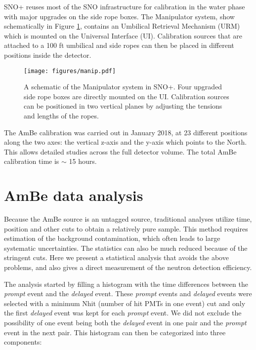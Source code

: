 \documentclass[a4paper]{jpconf}
\begin{document}
SNO+ reuses most of the SNO infrastructure for calibration\cite{Moffat:2005tq} in the water phase with major upgrades on the side rope boxes. The Manipulator system, show schematically in Figure \ref{fig:1}, contains an Umbilical Retrieval Mechanism (URM) which is mounted on the Universal Interface (UI). Calibration sources that are attached to a 100 ft umbilical and side ropes can then be placed in different positions inside the detector. 

\begin{figure}[h]
\texttt{[image: figures/manip.pdf]}\hspace{2pc}%
\begin{minipage}[b]{18pc}\caption{\label{fig:1}A schematic of the Manipulator system in SNO+. Four upgraded side rope boxes are directly mounted on the UI. Calibration sources can be positioned in two vertical planes by adjusting the tensions and lengths of the ropes.}
\end{minipage}
\end{figure}

The AmBe calibration was carried out in January 2018, at 23 different positions along the two axes: the vertical z-axis and the y-axis which points to the North. This allows detailed studies across the full detector volume. The total AmBe calibration time is $\sim$ 15 hours.

\section{AmBe data analysis}

Because the AmBe source is an untagged source, traditional analyses utilize time, position and other cuts to obtain a relatively pure sample. This method requires estimation of the background contamination, which often leads to large systematic uncertainties. The statistics can also be much reduced because of the stringent cuts. Here we present a statistical analysis that avoids the above problems, and also gives a direct measurement of the neutron detection efficiency.

The analysis started by filling a histogram with the time differences between the \textit{prompt} event and the \textit{delayed} event. These \textit{prompt} events and \textit{delayed} events were selected with a minimum Nhit (number of hit PMTs in one event) cut and only the first \textit{delayed} event was kept for each \textit{prompt} event. We did not exclude the possibility of one event being both the \textit{delayed} event in one pair and the \textit{prompt} event in the next pair. This histogram can then be categorized into three components:
\end{document}
